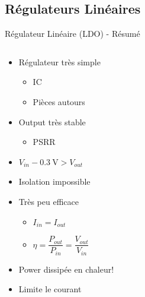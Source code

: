 \subsection{Régulateurs Linéaires}

\begin{frame}{Régulateur Linéaire (LDO) - Résumé}
    \begin{columns}
        \begin{column}{0.5\textwidth}
            \vspace{-24pt}
            \begin{itemize}
                \item<1-> Régulateur très simple
                \begin{itemize}
                    \item<1-> IC
                    \item<1-> Pièces autours
                \end{itemize}
                \item<2-> Output très stable
                \begin{itemize}
                    \item<2-> PSRR
                \end{itemize}
                \item<3-> $V_{in} - \SI{0.3}{\volt} > V_{out}$
                \item<3-> Isolation impossible
                \item<4-> Très peu efficace
                \begin{itemize}
                    \setlength{\itemsep}{4pt}
                    \item<4-> $I_{in} = I_{out}$
                    \item<4-> $\eta = \dfrac{P_{out}}{P_{in}} = \dfrac{V_{out}}{V_{in}}$
                \end{itemize}
                \item<5-> Power dissipée en chaleur!
                \item<5-> Limite le courant
            \end{itemize}
        \end{column}


\end{columns}
\end{frame}
